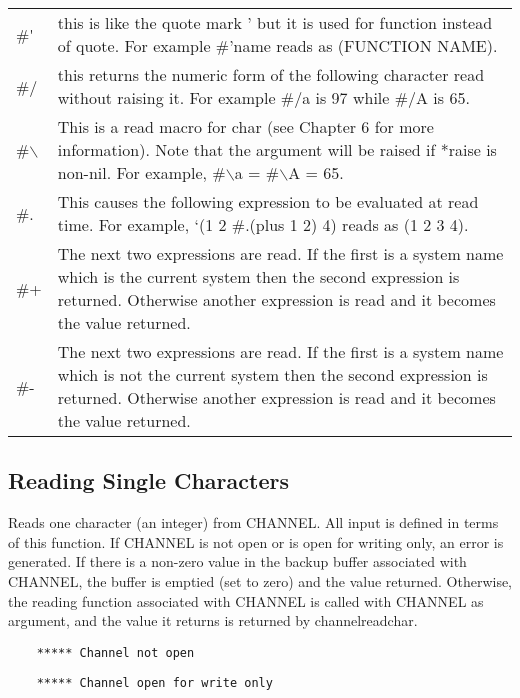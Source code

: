 \begin{tabular}{lp{11.0cm}}
    \#\' &            this is like the quote mark ' but it  is  used
                  for  function  instead  of quote.  For example
                  \#'name reads as (FUNCTION NAME).\\
    \#/ &            this returns the numeric form of the following
                  character  read  without  raising  it.     For
                  example \#/a is 97 while \#/A is 65.\\
    \#$\backslash$ & This  is  a read macro for char (see Chapter 6
                  for more information).  Note that the argument
                  will be raised  if  *raise  is  non-nil.   For
                  example, \#$\backslash$a = \#$\backslash$A = 65.\\
    \#. &            This  causes  the  following  expression to be
                  evaluated at read time.  For  example,  `(1  2
                  \#.(plus 1 2) 4) reads as (1 2 3 4).\\
    \#+ &            The  next  two  expressions  are read.  If the
                  first is a system name which  is  the  current
                  system then the second expression is returned.
                  Otherwise  another  expression  is read and it
                  becomes the value returned.\\
    \#- &            The next two expressions are  read.    If  the
                  first  is  a  system  name  which  is  not the
                  current system then the second  expression  is
                  returned.    Otherwise  another  expression is
                  read and it becomes the value returned.\\
\end{tabular}

\subsection{Reading Single Characters}

{}

 {    
Reads one character (an integer) from CHANNEL. All input is
    defined in terms of this function.  If CHANNEL is  not  open
    or  is  open  for  writing  only, an error is generated.  If
    there is a non-zero value in the  backup  buffer  associated
    with  CHANNEL,  the  buffer is emptied (set to zero) and the
    value returned.  Otherwise, the reading function  associated
    with  CHANNEL  is  called  with CHANNEL as argument, and the
    value it returns is returned by channelreadchar.}
\begin{verbatim}
    ***** Channel not open
\end{verbatim}
\begin{verbatim}
    ***** Channel open for write only
\end{verbatim}
{}

